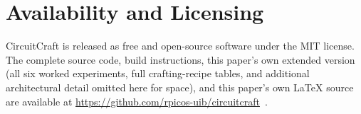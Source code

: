 \section*{Availability and Licensing}
\label{sec:availability}

CircuitCraft is released as free and open-source software under the MIT license. The
complete source code, build instructions, this paper's own extended version (all six worked
experiments, full crafting-recipe tables, and additional architectural detail omitted here
for space), and this paper's own \LaTeX{} source are available at
\url{https://github.com/rpicos-uib/circuitcraft}~\cite{picos2026circuitcraft}.